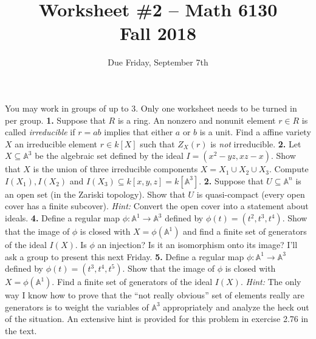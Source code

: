\documentclass[11pt]{amsart}
\theoremstyle{theorem}
\renewcommand{\to}[1][]{\xrightarrow{\ #1\ }}
\newcommand{\bA}{\mathbb{A}}
\begin{document}
\title{Worksheet \#2 -- Math 6130\\Fall 2018}
\author{Due Friday, September 7th}

\maketitle
You may work in groups of up to 3.  Only one worksheet needs to be turned in per group.
\vskip 9pt
\noindent
{\bf 1.}  Suppose that $R$ is a ring.  An nonzero and nonunit element $r \in R$ is called \emph{irreducible} if $r = ab$ implies that either $a$ or $b$ is a unit.  Find a affine variety $X$ an irreducible element $r \in k[X]$ such that $Z_X(r)$ is \emph{not} irreducible.  
\vskip 300pt
\noindent
{\bf 2.}   Let $X \subseteq \bA^3$ be the algebraic set defined by the ideal $I = (x^2-yz, xz - x)$.  Show that $X$ is the union of three irreducible components $X=X_1 \cup X_2 \cup X_3$.  Compute $I(X_1), I(X_2)$ and $I(X_3) \subseteq k[x,y,z] = k[\bA^3]$.  
\newpage
\noindent
{\bf 2.}  Suppose that $U \subseteq \bA^n$ is an open set (in the Zariski topology).  Show that $U$ is quasi-compact (every open cover has a finite subcover). 
\vskip 3pt
\emph{Hint:} Convert the open cover into a statement about ideals.
\vskip 200pt
\noindent
{\bf 4.}  Define a regular map $\phi : \bA^1 \to \bA^3$ defined by $\phi(t) = (t^2, t^3, t^4)$.  Show that the image of $\phi$ is closed with $X = \phi(\bA^1)$ and find a finite set of generators of the ideal $I(X)$.  Is $\phi$ an injection?  Is it an isomorphism onto its image?
\newpage
I'll ask a group to present this next Friday.
\vskip 3pt
\noindent
{\bf 5.}  Define a regular map $\phi : \bA^1 \to \bA^3$ defined by $\phi(t) = (t^3, t^4, t^5)$.  Show that the image of $\phi$ is closed with $X = \phi(\bA^1)$.  Find a finite set of generators of the ideal $I(X)$.  
\vskip 3pt
\emph{Hint:} The only way I know how to prove that the ``not really obvious'' set of elements really are generators is to weight the variables of $\bA^3$ appropriately and analyze the heck out of the situation.  An extensive hint is provided for this problem in exercise 2.76 in the text.
\end{document}
